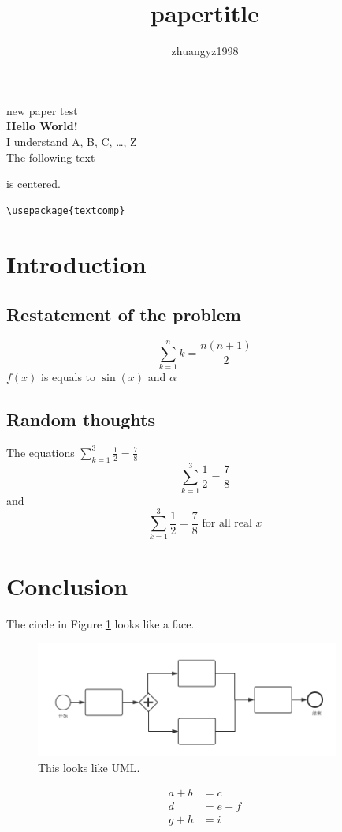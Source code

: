 \documentclass[12pt]{article}
\author{zhuangyz1998}
\title{papertitle}
\begin{document}
 
\maketitle  new paper test\\%
\textbf{Hello World!}\\
I understand A, B, C, \ldots, Z\\
The following text
\begin{center}
is centered.
\end{center}
\begin{verbatim}
\usepackage{textcomp}
\end{verbatim}

\tableofcontents

\section{Introduction}
\subsection{Restatement of the problem}
$$ \sum_{k=1}^n k = \frac{n(n+1)}{2} $$
$f(x)$ is equals to $\sin(x)$ and $\alpha$

\subsection{Random thoughts}
The equations
$\sum_{k=1}^3 \frac{1}{2} = \frac{7}{8}$
\begin{equation}
\sum_{k=1}^3 \frac{1}{2} = \frac{7}{8}
\end{equation}
and
\begin{equation*}
\sum_{k=1}^3 \frac{1}{2} = \frac{7}{8} \text{ for all real } x
\end{equation*}

\section{Conclusion}

The circle in Figure \ref{meterial} looks like a face.
\begin{figure}
\centering
\includegraphics[width = 10cm]{meterial.png}
\caption{This looks like UML.}
\label{meterial}
\end{figure}
\begin{align}
a + b &= c\\
	d &= e + f \nonumber\\
g + h &= i
\end{align}
\end{document}
